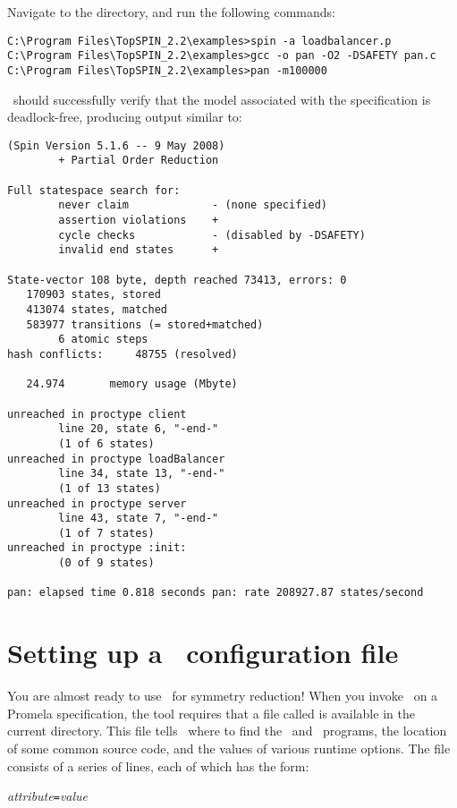 Navigate to the  directory, and run the following
commands:
%
\begin{lstlisting}
C:\Program Files\TopSPIN_2.2\examples>spin -a loadbalancer.p
C:\Program Files\TopSPIN_2.2\examples>gcc -o pan -O2 -DSAFETY pan.c
C:\Program Files\TopSPIN_2.2\examples>pan -m100000
\end{lstlisting}
%
\spin\ should successfully verify that the model associated with the
specification is deadlock-free, producing output similar to:
%
\begin{lstlisting}
(Spin Version 5.1.6 -- 9 May 2008)
        + Partial Order Reduction

Full statespace search for:
        never claim             - (none specified)
        assertion violations    +
        cycle checks            - (disabled by -DSAFETY)
        invalid end states      +

State-vector 108 byte, depth reached 73413, errors: 0
   170903 states, stored
   413074 states, matched
   583977 transitions (= stored+matched)
        6 atomic steps
hash conflicts:     48755 (resolved)

   24.974       memory usage (Mbyte)

unreached in proctype client
        line 20, state 6, "-end-"
        (1 of 6 states)
unreached in proctype loadBalancer
        line 34, state 13, "-end-"
        (1 of 13 states)
unreached in proctype server
        line 43, state 7, "-end-"
        (1 of 7 states)
unreached in proctype :init:
        (0 of 9 states)

pan: elapsed time 0.818 seconds pan: rate 208927.87 states/second
\end{lstlisting}

\section{Setting up a \protect\topspin\ configuration file}\label{sec:example:configuration}

You are almost ready to use \topspin\ for symmetry reduction!  When
you invoke \topspin\ on a Promela specification, the tool requires
that a file called  is available in the current
directory.  This file tells \topspin\ where to find the \gap\ and
\saucy\ programs, the location of some common source code, and the
values of various runtime options. The file consists of a series of
lines, each of which has the form:

\vspace{2mm} \emph{attribute}\texttt{=}\emph{value} \vspace{2mm}

